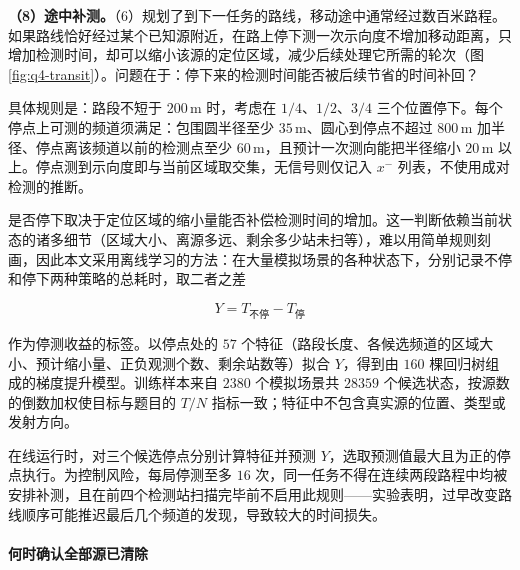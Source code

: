 \textbf{（8）途中补测。}（6）规划了到下一任务的路线，移动途中通常经过数百米路程。如果路线恰好经过某个已知源附近，在路上停下测一次示向度不增加移动距离，只增加检测时间，却可以缩小该源的定位区域，减少后续处理它所需的轮次（图\ref{fig:q4-transit}）。问题在于：停下来的检测时间能否被后续节省的时间补回？

具体规则是：路段不短于 $200\,\mathrm{m}$ 时，考虑在 $1/4$、$1/2$、$3/4$ 三个位置停下。每个停点上可测的频道须满足：包围圆半径至少 $35\,\mathrm{m}$、圆心到停点不超过 $800\,\mathrm{m}$ 加半径、停点离该频道以前的检测点至少 $60\,\mathrm{m}$，且预计一次测向能把半径缩小 $20\,\mathrm{m}$ 以上。停点测到示向度即与当前区域取交集，无信号则仅记入 $x^-$ 列表，不使用成对检测的推断。

是否停下取决于定位区域的缩小量能否补偿检测时间的增加。这一判断依赖当前状态的诸多细节（区域大小、离源多远、剩余多少站未扫等），难以用简单规则刻画，因此本文采用离线学习的方法：在大量模拟场景的各种状态下，分别记录不停和停下两种策略的总耗时，取二者之差

\begin{equation}\label{eq:q4-4}
Y=T_{\text{不停}}-T_{\text{停}}
\end{equation}

作为停测收益的标签。以停点处的 $57$ 个特征（路段长度、各候选频道的区域大小、预计缩小量、正负观测个数、剩余站数等）拟合 $Y$，得到由 $160$ 棵回归树组成的梯度提升模型。训练样本来自 $2380$ 个模拟场景共 $28359$ 个候选状态，按源数的倒数加权使目标与题目的 $T/N$ 指标一致；特征中不包含真实源的位置、类型或发射方向。

在线运行时，对三个候选停点分别计算特征并预测 $Y$，选取预测值最大且为正的停点执行。为控制风险，每局停测至多 $16$ 次，同一任务不得在连续两段路程中均被安排补测，且在前四个检测站扫描完毕前不启用此规则——实验表明，过早改变路线顺序可能推迟最后几个频道的发现，导致较大的时间损失。

\begin{center}
\begin{minipage}{\linewidth}
\centering
\QFourTransitFigure
{}
\label{fig:q4-transit}
\end{minipage}
\end{center}

\paragraph{何时确认全部源已清除}


